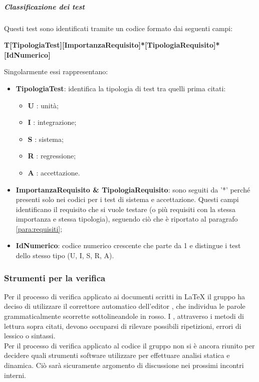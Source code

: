 \subparagraph{Classificazione dei test}
Questi test sono identificati tramite un codice formato dai seguenti campi:
\begin{center}
\textbf{T[TipologiaTest][ImportanzaRequisito]*[TipologiaRequisito]*[IdNumerico]} 
\end{center}
Singolarmente essi rappresentano:
\begin{itemize}
	\item \textbf{TipologiaTest}: identifica la tipologia di test tra quelli prima citati:
		\begin{itemize}
			\item \textbf{U} : unità;
			\item \textbf{I} : integrazione;
			\item \textbf{S} : sistema;
			\item \textbf{R} : regressione;
			\item \textbf{A} : accettazione.			 
		\end{itemize}
	\item \textbf{ImportanzaRequisito \& TipologiaRequisito}: sono seguiti da '*' perché presenti solo nei codici per i test di sistema e accettazione. Questi campi identificano il requisito che si vuole testare (o più requisiti con la stessa importanza e stessa tipologia), seguendo ciò che è riportato al paragrafo \ref{para:requisiti};
	\item \textbf{IdNumerico}: codice numerico crescente che parte da 1 e distingue i test dello stesso tipo (U, I, S, R, A).
\end{itemize}
 
\subsubsection{Strumenti per la verifica}
Per il processo di verifica applicato ai documenti scritti in \LaTeX{} il gruppo ha deciso di utilizzare il correttore automatico dell'editor , che individua le parole grammaticalmente scorrette sottolineandole in rosso. I , attraverso i metodi di lettura sopra citati, devono occuparsi di rilevare possibili ripetizioni, errori di lessico o sintassi.  \\
\linebreak
Per il processo di verifica applicato al codice il gruppo non si è ancora riunito per decidere quali strumenti software utilizzare per effettuare analisi statica e dinamica. Ciò sarà sicuramente argomento di discussione nei prossimi incontri interni.

















